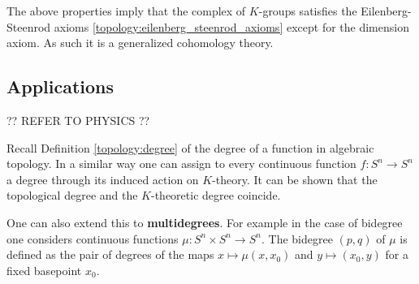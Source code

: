 {    \begin{remark}
        The above properties imply that the complex of $K$-groups satisfies the Eilenberg-Steenrod axioms \ref{topology:eilenberg_steenrod_axioms} except for the dimension axiom. As such it is a generalized cohomology theory.
    \end{remark}

\subsection{Applications}

    ?? REFER TO PHYSICS ??

    \begin{property}[Degree]
        Recall Definition \ref{topology:degree} of the degree of a function in algebraic topology. In a similar way one can assign to every continuous function $f:S^n\rightarrow S^n$ a degree through its induced action on $K$-theory. It can be shown that the topological degree and the $K$-theoretic degree coincide.

        One can also extend this to \textbf{multidegrees}. For example in the case of bidegree one considers continuous functions $\mu:S^n\times S^n\rightarrow S^n$. The bidegree $(p,q)$ of $\mu$ is defined as the pair of degrees of the maps $x\mapsto\mu(x,x_0)$ and $y\mapsto(x_0,y)$ for a fixed basepoint $x_0$.
    \end{property}


}
